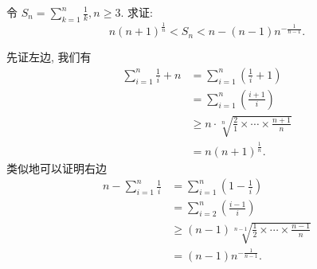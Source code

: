 \begin{prob}
\label{prob:prob-7}
令 $S_n = \sum_{k=1}^n \frac{1}{k}, n \ge 3$. 求证:
\[
n(n+1)^{\frac{1}{n}} < S_n < n - (n-1)n^{-\frac{1}{n-1}}.
\]
\end{prob}

\begin{soln}
先证左边, 我们有
\begin{align*}
\sum_{i=1}^n\frac{1}{i} + n &= \sum_{i=1}^n\left(\frac{1}{i} + 1\right)\\
                            &= \sum_{i=1}^n\left(\frac{i+1}{i}\right)\\
                            &\ge n\cdot \sqrt[n]{\frac{2}{1}\times \cdots \times \frac{n+1}{n}}\\
                            &= n(n+1)^{\frac{1}{n}}.
\end{align*}
类似地可以证明右边
\begin{align*}
n - \sum_{i=1}^n \frac{1}{i} &= \sum_{i=1}^n\left(1 - \frac{1}{i}\right)\\
                             &= \sum_{i=2}^n\left(\frac{i-1}{i}\right)\\
                             &\ge (n-1)\sqrt[n-1]{\frac{1}{2}\times \cdots \times \frac{n-1}{n}}\\
                             &= (n-1)n^{-\frac{1}{n-1}}.
\end{align*}
\end{soln}

